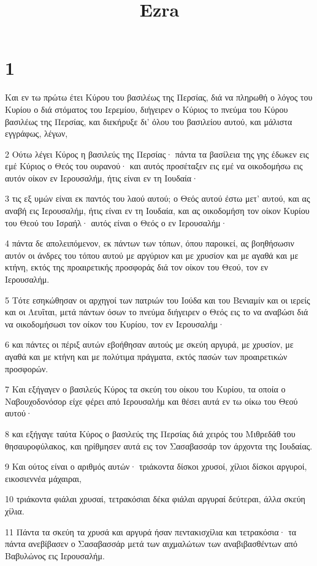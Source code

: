 

\title{Ezra}


\chapter{1}

\par Και εν τω πρώτω έτει Κύρου του βασιλέως της Περσίας, διά να πληρωθή ο λόγος του Κυρίου ο διά στόματος του Ιερεμίου, διήγειρεν ο Κύριος το πνεύμα του Κύρου βασιλέως της Περσίας, και διεκήρυξε δι' όλου του βασιλείου αυτού, και μάλιστα εγγράφως, λέγων,
\par 2 Ούτω λέγει Κύρος η βασιλεύς της Περσίας· πάντα τα βασίλεια της γης έδωκεν εις εμέ Κύριος ο Θεός του ουρανού· και αυτός προσέταξεν εις εμέ να οικοδομήσω εις αυτόν οίκον εν Ιερουσαλήμ, ήτις είναι εν τη Ιουδαία·
\par 3 τις εξ υμών είναι εκ παντός του λαού αυτού; ο Θεός αυτού έστω μετ' αυτού, και ας αναβή εις Ιερουσαλήμ, ήτις είναι εν τη Ιουδαία, και ας οικοδομήση τον οίκον Κυρίου του Θεού του Ισραήλ· αυτός είναι ο Θεός ο εν Ιερουσαλήμ·
\par 4 πάντα δε απολειπόμενον, εκ πάντων των τόπων, όπου παροικεί, ας βοηθήσωσιν αυτόν οι άνδρες του τόπου αυτού με αργύριον και με χρυσίον και με αγαθά και με κτήνη, εκτός της προαιρετικής προσφοράς διά τον οίκον του Θεού, τον εν Ιερουσαλήμ.
\par 5 Τότε εσηκώθησαν οι αρχηγοί των πατριών του Ιούδα και του Βενιαμίν και οι ιερείς και οι Λευΐται, μετά πάντων όσων το πνεύμα διήγειρεν ο Θεός εις το να αναβώσι διά να οικοδομήσωσι τον οίκον του Κυρίου, τον εν Ιερουσαλήμ·
\par 6 και πάντες οι πέριξ αυτών εβοήθησαν αυτούς με σκεύη αργυρά, με χρυσίον, με αγαθά και με κτήνη και με πολύτιμα πράγματα, εκτός πασών των προαιρετικών προσφορών.
\par 7 Και εξήγαγεν ο βασιλεύς Κύρος τα σκεύη του οίκου του Κυρίου, τα οποία ο Ναβουχοδονόσορ είχε φέρει από Ιερουσαλήμ και θέσει αυτά εν τω οίκω του Θεού αυτού·
\par 8 και εξήγαγε ταύτα Κύρος ο βασιλεύς της Περσίας διά χειρός του Μιθρεδάθ του θησαυροφύλακος, και ηρίθμησεν αυτά εις τον Σασαβασσάρ τον άρχοντα της Ιουδαίας.
\par 9 Και ούτος είναι ο αριθμός αυτών· τριάκοντα δίσκοι χρυσοί, χίλιοι δίσκοι αργυροί, εικοσιεννέα μάχαιραι,
\par 10 τριάκοντα φιάλαι χρυσαί, τετρακόσιαι δέκα φιάλαι αργυραί δεύτεραι, άλλα σκεύη χίλια.
\par 11 Πάντα τα σκεύη τα χρυσά και αργυρά ήσαν πεντακισχίλια και τετρακόσια· τα πάντα ανεβίβασεν ο Σασαβασσάρ μετά των αιχμαλώτων των αναβιβασθέντων από Βαβυλώνος εις Ιερουσαλήμ.

